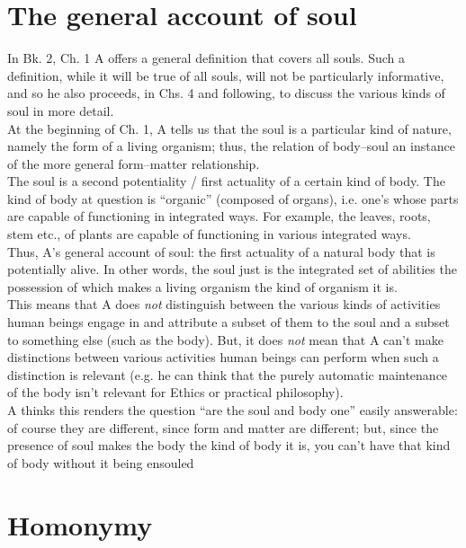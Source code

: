 \documentclass[11pt]{article}
\begin{document}
\section*{The general account of soul}

\noindent In Bk. 2, Ch. 1 A offers a general definition that covers all souls. Such a definition, while it will be true of all souls, will not be particularly informative, and so he also proceeds, in Chs. 4 and following, to discuss the various kinds of soul in more detail. \\

\noindent At the beginning of Ch. 1, A tells us that the soul is a particular kind of nature, namely the form of a living organism; thus, the relation of body--soul an instance of the more general form--matter relationship.\\

\noindent The soul is a second potentiality / first actuality of a certain kind of body. The kind of body at question is ``organic'' (composed of organs), i.e. one's whose parts are capable of functioning in integrated ways. For example, the leaves, roots, stem etc., of plants are capable of functioning in various integrated ways.\\

\noindent Thus, A's general account of soul: the first actuality of a natural body that is potentially alive. In other words, the soul just is the integrated set of abilities the possession of which makes a living organism the kind of organism it is.\\

\noindent This means that A does \emph{not} distinguish between the various kinds of activities human beings engage in and attribute a subset of them to the soul and a subset to something else (such as the body). But, it does \emph{not} mean that A can't make distinctions between various activities human beings can perform when such a distinction is relevant (e.g. he can think that the purely automatic maintenance of the body isn't relevant for Ethics or practical philosophy).\\

\noindent A thinks this renders the question ``are the soul and body one'' easily answerable: of course they are different, since form and matter are different; but, since the presence of soul makes the body the kind of body it is, you can't have that kind of body without it being ensouled

\section*{Homonymy}
\end{document}

